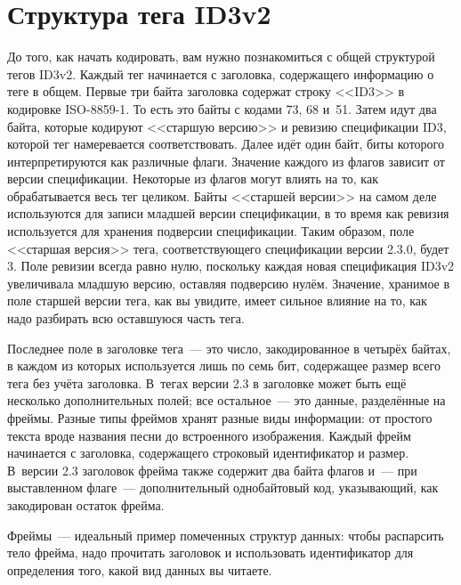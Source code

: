\section{Структура тега ID3v2}

До того, как начать кодировать, вам нужно познакомиться с общей структурой тегов
ID3v2. Каждый тег начинается с заголовка, содержащего информацию о теге в общем. Первые
три байта заголовка содержат строку <<ID3>> в кодировке ISO-8859-1. То есть это байты с
кодами 73, 68 и~51. Затем идут два байта, которые кодируют <<старшую версию>> и ревизию
спецификации ID3, которой тег намеревается соответствовать. Далее идёт один байт, биты
которого интерпретируются как различные флаги. Значение каждого из флагов зависит от
версии спецификации. Некоторые из флагов могут влиять на то, как обрабатывается весь тег
целиком.  Байты <<старшей версии>> на самом деле используются для записи младшей версии
спецификации, в то время как ревизия используется для хранения подверсии
спецификации. Таким образом, поле <<старшая версия>> тега, соответствующего спецификации
версии 2.3.0, будет 3. Поле ревизии всег\-да равно нулю, поскольку каждая новая спецификация
ID3v2 увеличивала младшую версию, оставляя подверсию нулём. Значение, хранимое в поле
старшей версии тега, как вы увидите, имеет сильное влияние на то, как надо разбирать всю
оставшуюся часть тега.

Последнее поле в заголовке тега~--- это число, закодированное в четырёх байтах, в каждом из
которых используется лишь по семь бит, содержащее размер всего тега без учёта заголовка.
В~тегах версии 2.3 в заголовке может быть ещё несколько дополнительных полей; все
остальное~--- это данные, разделённые на фреймы.  Разные типы фреймов хранят разные виды
информации: от простого текста вроде названия песни до встроенного изображения.  Каждый
фрейм начинается с заголовка, содержащего строковый идентификатор и размер. В~версии 2.3
заголовок фрейма также содержит два байта флагов и~--- при выставленном флаге~---
дополнительный однобайтовый код, указывающий, как закодирован остаток фрейма.

Фреймы~--- идеальный пример помеченных структур данных: чтобы распарсить тело
фрейма, надо прочитать заголовок и использовать идентификатор для определения того, какой вид
данных вы читаете.

